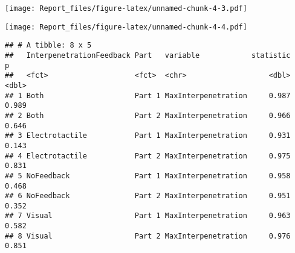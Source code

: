 \documentclass[
]{article}
\newenvironment{Shaded}{\begin{snugshade}}{\end{snugshade}}
\newcommand{\CommentTok}[1]{\textcolor[rgb]{0.56,0.35,0.01}{\textit{#1}}}
\newcommand{\KeywordTok}[1]{\textcolor[rgb]{0.13,0.29,0.53}{\textbf{#1}}}
\newcommand{\NormalTok}[1]{#1}
\newcommand{\OperatorTok}[1]{\textcolor[rgb]{0.81,0.36,0.00}{\textbf{#1}}}
\newcommand{\StringTok}[1]{\textcolor[rgb]{0.31,0.60,0.02}{#1}}
\begin{document}
\begin{Shaded}
\end{Shaded}

\texttt{[image: Report\_files/figure-latex/unnamed-chunk-4-3.pdf]}

\begin{Shaded}
\end{Shaded}

\texttt{[image: Report\_files/figure-latex/unnamed-chunk-4-4.pdf]}

\begin{Shaded}
\end{Shaded}

\begin{verbatim}
## # A tibble: 8 x 5
##   InterpenetrationFeedback Part   variable            statistic     p
##   <fct>                    <fct>  <chr>                   <dbl> <dbl>
## 1 Both                     Part 1 MaxInterpenetration     0.987 0.989
## 2 Both                     Part 2 MaxInterpenetration     0.966 0.646
## 3 Electrotactile           Part 1 MaxInterpenetration     0.931 0.143
## 4 Electrotactile           Part 2 MaxInterpenetration     0.975 0.831
## 5 NoFeedback               Part 1 MaxInterpenetration     0.958 0.468
## 6 NoFeedback               Part 2 MaxInterpenetration     0.951 0.352
## 7 Visual                   Part 1 MaxInterpenetration     0.963 0.582
## 8 Visual                   Part 2 MaxInterpenetration     0.976 0.851
\end{verbatim}

\begin{Shaded}
\end{Shaded}
\end{document}
